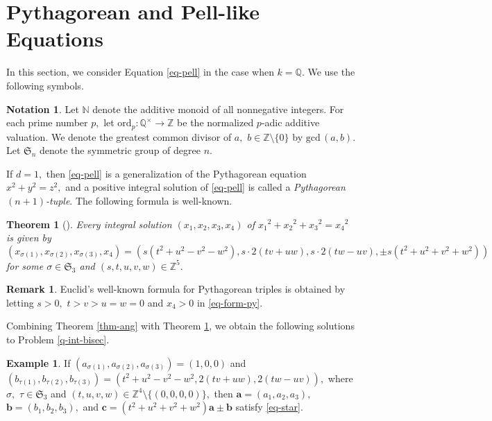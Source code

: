 \documentclass{article}
\theoremstyle{definition}
\newtheorem{note}{Notation}
\newtheorem{eg}{Example}
\newtheorem{rmk}{Remark}
\theoremstyle{plain}
\newtheorem{thm}{Theorem}
\begin{document}
\section{Pythagorean and Pell-like Equations}\label{sec-plike}
In this section, we consider Equation \eqref{eq-pell} in the case when $k = \mathbb Q.$ 
We use the following symbols.
\begin{note}
Let $\mathbb N$ denote the additive monoid of all nonnegative integers. 
For each prime number $p,$ let $\mathrm{ord}_p:\mathbb Q^\times\to\mathbb Z$ be the normalized $p$-adic additive valuation. 
We denote the greatest common divisor of $a,$ $b \in \mathbb Z\setminus\{ 0\}$ by $\mathrm{gcd}\,(a,b).$ 
Let $\mathfrak S_n$ denote the symmetric group of degree $n.$
\end{note}
If $d = 1,$ then \eqref{eq-pell} is a generalization of the Pythagorean equation $x^2+y^2 = z^2,$ and a positive integral solution of \eqref{eq-pell} is called a {\it Pythagorean $(n+1)$-tuple}. 
The following formula is well-known. 
\begin{thm}[{\cite[Section 10]{Car15}}]\label{thm-form-py}
Every integral solution $(x_1,x_2,x_3,x_4)$ of $x_1{}^2+x_2{}^2+x_3{}^2 = x_4{}^2$ is given by 
\begin{equation} 
(x_{\sigma (1)},x_{\sigma (2)},x_{\sigma (3)},x_4) = (s(t^2+u^2-v^2-w^2),s\cdot 2(tv+uw),s\cdot 2(tw-uv),\pm s(t^2+u^2+v^2+w^2)) \label{eq-form-py} 
\end{equation} 
for some $\sigma \in \mathfrak S_3$ and $(s,t,u,v,w) \in \mathbb Z^5.$
\end{thm}
\begin{rmk}
Euclid's well-known formula for Pythagorean triples is obtained by letting $s > 0,$ $t > v > u = w = 0$ and $x_4 > 0$ in \eqref{eq-form-py}.
\end{rmk}
Combining Theorem \ref{thm-ang} with Theorem \ref{thm-form-py}, we obtain the following solutions to Problem \ref{q-int-bisec}.
\begin{eg}
If $(a_{\sigma (1)},a_{\sigma (2)},a_{\sigma (3)}) = (1,0,0)$ and $(b_{\tau (1)},b_{\tau (2)},b_{\tau (3)}) = (t^2+u^2-v^2-w^2,2(tv+uw),2(tw-uv)),$ where $\sigma,$ $\tau \in \mathfrak S_3$ and $(t,u,v,w) \in \mathbb Z^4\setminus \{ (0,0,0,0)\},$ then $\bm{a} = (a_1,a_2,a_3),$ $\bm{b} = (b_1,b_2,b_3),$ and $\bm{c} = (t^2+u^2+v^2+w^2)\bm{a}\pm\bm{b}$ satisfy \eqref{eq-star}.
\end{eg}
\end{document}
